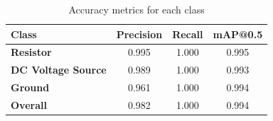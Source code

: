 \documentclass{beamer}
\begin{document}
\begin{frame}[t]
\begin{columns}[t]
\begin{column}{\colwidth}
      {\beamerblocknoheader
        \begin{block}{}
          \begin{table}[t]
            \centering
            \begin{subtable}{0.90\textwidth}
              \centering\small
              \begin{tabular}{@{}lccc@{}}
                \toprule
                \textbf{Class}             & \textbf {Precision} & \textbf {Recall} & \textbf{mAP@0.5} \\
                \midrule
                \textbf{Resistor}          & 0.995               & 1.000            & 0.995            \\
                \textbf{DC Voltage Source} & 0.989               & 1.000            & 0.993            \\
                \textbf{Ground}            & 0.961               & 1.000            & 0.994            \\
                \textbf{Overall}           & 0.982               & 1.000            & 0.994            \\
              \end{tabular}
              \caption{Accuracy metrics for each class}
              \label{tab:accuracy-metrics}
            \end{subtable}


\end{table}
\end{block}}
\end{column}
\end{columns}
\end{frame}
\end{document}
